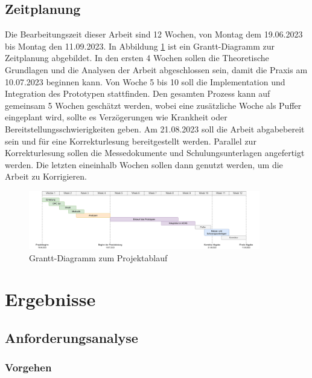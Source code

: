 \documentclass[a4paper, 12pt, oneside]{scrbook}
\begin{document}
	
	\section{Zeitplanung}
	
	Die Bearbeitungszeit dieser Arbeit sind 12 Wochen, von Montag dem 19.06.2023 bis Montag den 11.09.2023. In Abbildung \ref{fig:Grantt} ist ein Grantt-Diagramm zur Zeitplanung abgebildet. In den ersten 4 Wochen sollen die Theoretische Grundlagen und die Analysen der Arbeit abgeschlossen sein, damit die Praxis am 10.07.2023 beginnen kann. Von Woche 5 bis 10 soll die Implementation und Integration des Prototypen stattfinden. Den gesamten Prozess kann auf gemeinsam 5 Wochen geschätzt werden,  wobei eine zusätzliche Woche als Puffer eingeplant wird, sollte es Verzögerungen wie Krankheit oder Bereitstellungsschwierigkeiten geben. Am 21.08.2023 soll die Arbeit abgabebereit sein und für eine Korrekturlesung bereitgestellt werden. Parallel zur Korrekturlesung sollen die Messedokumente und Schulungsunterlagen angefertigt werden. Die letzten eineinhalb Wochen sollen dann genutzt werden, um die Arbeit zu Korrigieren.
	
	\begin{figure}[H]
		\centering
		\includegraphics[width=0.9\textwidth]{res/analysen/Grantt-Diagramm.pdf}
		\caption{Grantt-Diagramm zum Projektablauf}
		\label{fig:Grantt}
	\end{figure}
	
	
\chapter{Ergebnisse}\label{ch:Ergebnisse}
	
	
	\section{Anforderungsanalyse}
	
		\subsection{Vorgehen}
		
\end{document}
